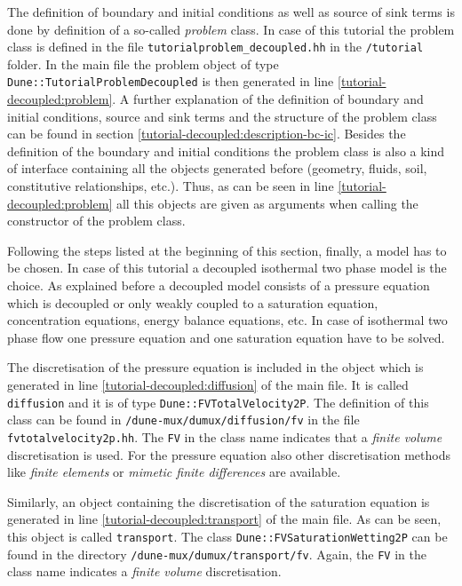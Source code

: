 The definition of boundary and initial conditions as well as source of sink terms is done by definition of a so-called \textit{problem} class. In case of this tutorial the problem class is defined in the file \texttt{tutorialproblem\_decoupled.hh} in the \texttt{/tutorial} folder. In the main file the problem object of type \texttt{Dune::TutorialProblemDecoupled} is then generated in line \ref{tutorial-decoupled:problem}. A further explanation of the definition of boundary and initial conditions, source and sink terms and the structure of the problem class can be found in section \ref{tutorial-decoupled:description-bc-ic}. Besides the definition of the boundary and initial conditions the problem class is also a kind of interface containing all the objects generated before (geometry, fluids, soil, constitutive relationships, etc.). Thus, as can be seen in line \ref{tutorial-decoupled:problem} all this objects are given as arguments when calling the constructor of the problem class.

Following the steps listed at the beginning of this section, finally, a model has to be chosen. In case of this tutorial a decoupled isothermal two phase model is the choice. As explained before a decoupled model consists of a pressure equation which is decoupled or only weakly coupled to a saturation equation, concentration equations, energy balance equations, etc. In case of isothermal two phase flow one pressure equation and one saturation equation have to be solved. 

The discretisation of the pressure equation is included in the object which is generated in line \ref{tutorial-decoupled:diffusion} of the main file. It is called \texttt{diffusion} and it is of type \texttt{Dune::FVTotalVelocity2P}. The definition of this class can be found in \texttt{/dune-mux/dumux/diffusion/fv} in the file \texttt{fvtotalvelocity2p.hh}. The \texttt{FV} in the class name indicates that a \textit{finite volume} discretisation is used. For the pressure equation also other discretisation methods like \textit{finite elements} or \textit{mimetic finite differences} are available.

Similarly, an object containing the discretisation of the saturation equation is generated in line \ref{tutorial-decoupled:transport} of the main file. As can be seen, this object is called \texttt{transport}. The class  \texttt{Dune::FVSaturationWetting2P} can be found in the directory \texttt{/dune-mux/dumux/transport/fv}. Again, the \texttt{FV} in the class name indicates a \textit{finite volume} discretisation.

